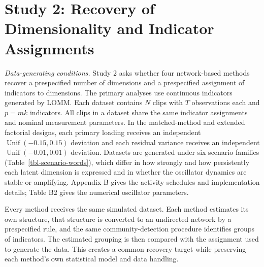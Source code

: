 \documentclass[
]{article}
\begin{document}
\section{Study 2: Recovery of Dimensionality and Indicator
Assignments}\label{study-2-recovery-of-dimensionality-and-indicator-assignments}

\emph{Data-generating conditions.} Study 2 asks whether four
network-based methods recover a prespecified number of dimensions and a
prespecified assignment of indicators to dimensions. The primary
analyses use continuous indicators generated by LOMM. Each dataset
contains \(N\) clips with \(T\) observations each and \(p=mk\)
indicators. All clips in a dataset share the same indicator assignments
and nominal measurement parameters. In the matched-method and extended
factorial designs, each primary loading receives an independent
\(\operatorname{Unif}(-0.15,0.15)\) deviation and each residual variance
receives an independent \(\operatorname{Unif}(-0.01,0.01)\) deviation.
Datasets are generated under six scenario families
(Table~\ref{tbl-scenario-words}), which differ in how strongly and how
persistently each latent dimension is expressed and in whether the
oscillator dynamics are stable or amplifying. Appendix B gives the
activity schedules and implementation details; Table B2 gives the
numerical oscillator parameters.

Every method receives the same simulated dataset. Each method estimates
its own structure, that structure is converted to an undirected network
by a prespecified rule, and the same community-detection procedure
identifies groups of indicators. The estimated grouping is then compared
with the assignment used to generate the data. This creates a common
recovery target while preserving each method's own statistical model and
data handling.

\begin{table}[H]

\caption{\label{tbl-scenario-words}The six Study 2 scenario families.
Numeric activity gains and dwell fractions are in Appendix B; oscillator
parameters are in Table B2.}


\end{table}%
\end{document}
